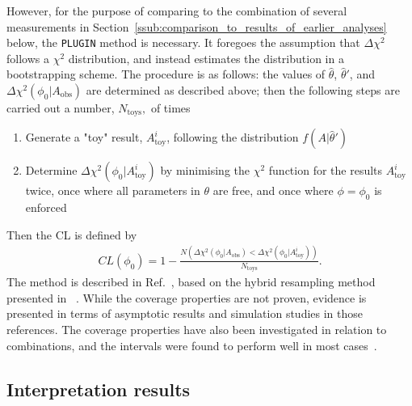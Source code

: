 However, for the purpose of comparing to the combination of several \lhcb measurements in Section~\ref{ssub:comparison_to_results_of_earlier_analyses} below, the \texttt{PLUGIN} method is necessary. It foregoes the assumption that $\Delta \chi^2$ follows a $\chi^2$ distribution, and instead estimates the distribution in a bootstrapping scheme. The procedure is as follows: the values of $\hat \theta$, $\hat \theta'$, and $\Delta \chi^2(\phi_0|A_\mathrm{obs})$ are determined as described above; then the following steps are carried out a number, $N_\mathrm{toys}, $ of times
\begin{enumerate}
    \item Generate a "toy" result, $A^i_\mathrm{toy}$, following the distribution $f(A|\hat\theta')$
    \item Determine $\Delta \chi^2(\phi_0|A^i_\mathrm{toy})$ by minimising the $\chi^2$ function for the results $A^i_\mathrm{toy}$ twice, once where all parameters in $\theta$ are free, and once where $\phi=\phi_0$ is enforced
\end{enumerate}
Then the CL is defined by
\begin{align}
    CL(\phi_0) = 1-\frac{N(\Delta \chi^2(\phi_0|A_\mathrm{obs}) < \Delta \chi^2(\phi_0|A^i_\mathrm{toy}))}{N_\mathrm{toys}}.
\end{align}
The method is described in Ref.~\cite{senUnifiedMethodNuisance2009}, based on the hybrid resampling method presented in ~\cite{chuangResamplingMethodsConfidence1998,chuangHybridResamplingMethods2000}. While the coverage properties are not proven, evidence is presented in terms of asymptotic results and simulation studies in those references. The coverage properties have also been investigated in relation to \lhcb combinations, and the intervals were found to perform well in most cases~\cite{}.

\subsection{Interpretation results} %
\label{sub:interpretation_results}


